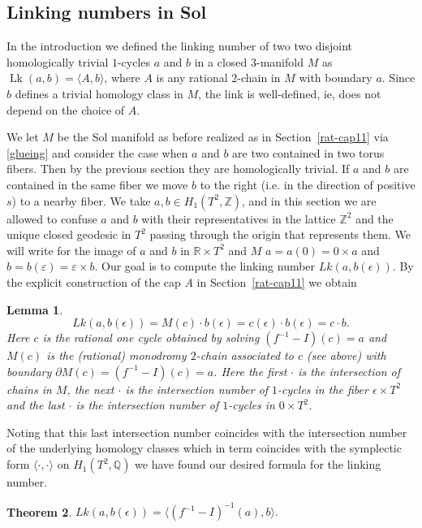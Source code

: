 \documentclass[12pt,leqno]{amsart}
\numberwithin{equation}{section}
\theoremstyle{plain}
\newtheorem{theorem}{Theorem}[section]
\newtheorem{lemma}[theorem]{Lemma}
\theoremstyle{definition}
\theoremstyle{remark}
\newcommand{\R}{\mathbb{R}}
\newcommand{\Q}{\mathbb{Q}}
\newcommand{\Z}{\mathbb{Z}}
\newcommand{\eps}{\varepsilon}
\newcommand{\Lk}{\operatorname{Lk}}
\begin{document}
\subsection{Linking numbers in Sol} \label{generaltheoryoflink}


In the introduction we defined the linking number of two two disjoint homologically trivial $1$-cycles $a$ and $b$ in a closed $3$-manifold $M$ as $\Lk(a,b) = \langle A,b \rangle$, where $A$ is any rational $2$-chain in $M$ with boundary $a$. Since $b$ defines a trivial homology class in $M$, the link is well-defined, ie, does not depend on the choice of $A$. 

We let $M$ be the Sol manifold as before realized as in Section~\ref{rat-cap11} via \eqref{glueing} and consider the case when $a$ and $b$ are two contained in two torus fibers. Then by the previous section they are homologically trivial. If $a$ and $b$ are contained in the same fiber we move $b$ to the right (i.e. in the direction of positive $s$)  to a nearby fiber. We take $a,b \in H_1(T^2,\Z)$, and in this section we are allowed to confuse $a$ and $b$ with their representatives in the lattice $\Z^2$ and the unique closed geodesic in $T^2$ passing through the origin that represents them. We will write for the image of $a$ and $b$ in $\R \times T^2$ and $M$ $a=a(0)=0 \times a$ and $b=b(\eps)= \eps \times b$. Our goal is to compute the linking number $Lk(a, b(\epsilon))$. By the explicit construction of the cap $A$ in Section~\ref{rat-cap11} we obtain

\begin{lemma}
 \[
 Lk(a,b(\epsilon)) = M(c) \cdot b(\epsilon) = c(\epsilon) \cdot b(\epsilon)= c \cdot b.
 \] 
Here $c$ is the rational one cycle obtained by solving $(f^{-1} - I) (c) =a$
and $M(c)$ is the (rational) monodromy $2$-chain associated to $c$ (see above) with boundary $\partial M(c) = (f^{-1} - I) (c) =a$. Here the first $\cdot$ is the intersection of 
chains in $M$, the next $\cdot$ is the intersection number of $1$-cycles in the fiber $\epsilon \times T^2$ and the last $\cdot$ is the intersection number of $1$-cycles in $0 \times T^2$. 
 \end{lemma}

Noting that this last intersection number coincides with the intersection number of the underlying homology classes which in term coincides with the symplectic form $\langle \cdot, \cdot \rangle$ on $H_1(T^2,\Q)$ we have found our desired formula for the linking number.
\begin{theorem}\label{linkSol}
$ Lk(a, b(\epsilon)) = \langle (f^{-1} - I)^{-1} (a), b \rangle.$
\end{theorem}
\end{document}
